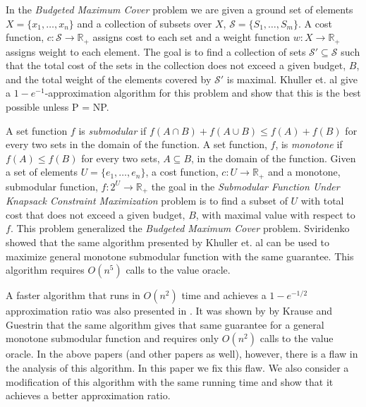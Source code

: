 In the \emph{Budgeted Maximum Cover} problem we are given a ground set of elements 
$X = \{x_1, \dots, x_n\}$ and a collection of subsets over $X$, 
$\mathcal{S} = \{S_1, \dots, S_m\}$.
A cost function, $c:\mathcal{S} \to \mathbb{R}_+$ assigns cost to each set 
and a weight function $w:X \to \mathbb{R}_+$ assigns weight to each element. 
The goal is to find a collection of sets $\mathcal{S'} \subseteq \mathcal{S}$ such that the 
total cost of the sets in the collection does not exceed a given budget, $B$, and the 
total weight of the elements covered by $\mathcal{S'}$ is maximal.
Khuller et. al \cite{khuller1999budgeted} 
give a $1-e^{-1}$-approximation algorithm for this problem and show that this is
the best possible unless P = NP.   

A set function $f$ is \emph{submodular} if $f(A \cap B) + f(A \cup B) \leq f(A) + f(B)$ 
for every two sets in the domain of the function. A set function, $f$, is \emph{monotone} if 
$f(A) \leq f(B)$ for every two sets, $A \subseteq B$, in the domain of the function.
Given a set of elements $U = \{e_1, \dots, e_n\}$, a cost function, 
$c:U \to \mathbb{R}_+$ and a monotone, submodular function, $f:2^U \to \mathbb{R}_+$ 
the goal in the \emph{Submodular Function Under
Knapsack Constraint Maximization} problem is to find a subset of $U$ with total cost that does not exceed
a given budget, $B$, with maximal value with respect to $f$.
This problem generalized the \emph{Budgeted Maximum Cover} problem. 
Sviridenko \cite{sviridenko2004note} showed that the same algorithm presented by 
Khuller et. al can be used to maximize general monotone submodular function 
with the same guarantee.
This algorithm requires $O(n^5)$ calls to the value oracle. 

A faster algorithm that runs in $O(n^2)$ time and achieves a $1 - e^{-1/2}$ approximation ratio
was also presented in \cite{khuller1999budgeted}. 
It was shown by by Krause and Guestrin \cite{krause2005note} that the same algorithm 
gives that same guarantee for a general monotone submodular function and requires only 
$O(n^2)$ calls to the value oracle.
In the above papers (and other papers as well), however, there is a flaw in the analysis of this
algorithm. 
In this paper we fix this flaw. 
We also consider a modification of this algorithm with the same running time and show that it
achieves a better approximation ratio.   